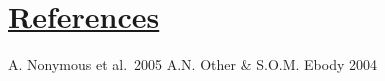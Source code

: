 \documentclass{article}
\begin{document}
\newpage

\section{\underline{References}}

\begingroup
\renewcommand{\section}[2]{}%
\begin{thebibliography}{}
    A. Nonymous et al.\ 2005
    A.N. Other \& S.O.M. Ebody 2004
\end{thebibliography}
\endgroup
\end{document}
